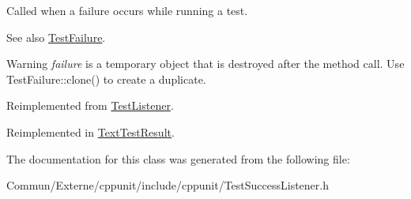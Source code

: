 Called when a failure occurs while running a test. 

\begin{DoxySeeAlso}{See also}
\hyperlink{class_test_failure}{Test\+Failure}. 
\end{DoxySeeAlso}
\begin{DoxyWarning}{Warning}
{\itshape failure} is a temporary object that is destroyed after the method call. Use Test\+Failure\+::clone() to create a duplicate. 
\end{DoxyWarning}


Reimplemented from \hyperlink{class_test_listener_a103216a5814c907f7b752b969477e765}{Test\+Listener}.



Reimplemented in \hyperlink{class_text_test_result_a05d3b0e8e51b3430092166bbc3d17708}{Text\+Test\+Result}.



The documentation for this class was generated from the following file\+:\begin{DoxyCompactItemize}
\item 
Commun/\+Externe/cppunit/include/cppunit/Test\+Success\+Listener.\+h\end{DoxyCompactItemize}
